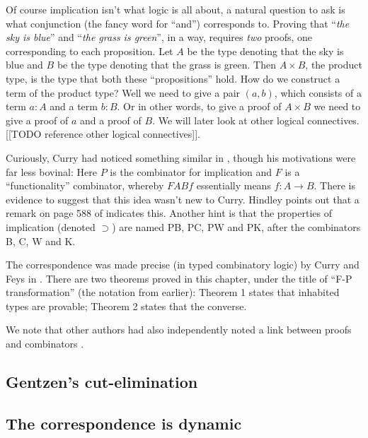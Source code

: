 Of course implication isn't what logic is all about, a natural question to ask is what conjunction (the fancy word for ``and'') corresponds to. Proving that ``\emph{the sky is blue}'' and ``\emph{the grass is green}'', in a way, requires \emph{two} proofs, one corresponding to each proposition. Let $A$ be the type denoting that the sky is blue and $B$ be the type denoting that the grass is green. Then $A \times B$, the product type, is the type that both these ``propositions'' hold. How do we construct a term of the product type? Well we need to give a pair $(a, b)$, which consists of a term $a : A$ and a term $b : B$. Or in other words, to give a proof of $A \times B$ we need to give a proof of $a$ and a proof of $B$. We will later look at other logical connectives. [[TODO reference other logical connectives]].

Curiously, Curry had noticed something similar in \cite[footnote 28]{10.2307/2266302}, though his motivations were far less bovinal: 
Here $P$ is the combinator for implication and $F$ is a ``functionality'' combinator, whereby $F A B f$ essentially means $f : A \to B$.
There is evidence to suggest that this idea wasn't new to Curry. Hindley \cite{hindley_1997} points out that a remark on page 588 of \cite{10.2307/86796} indicates this. Another hint is that the properties of implication (denoted $\supset$) are named PB, PC, PW and PK, after the combinators B, C, W and K.

The correspondence was made precise (in typed combinatory logic) by Curry and Feys in \cite[Chapter 9]{curry1958combinatory}. There are two theorems proved in this chapter, under the title of ``F-P transformation'' (the notation from earlier): Theorem 1 states that inhabited types are provable; Theorem 2 states that the converse.

We note that other authors had also independently noted a link between proofs and combinators \cite{meredith1963}. 

\subsection{Gentzen's cut-elimination}




\subsection{The correspondence is dynamic}






